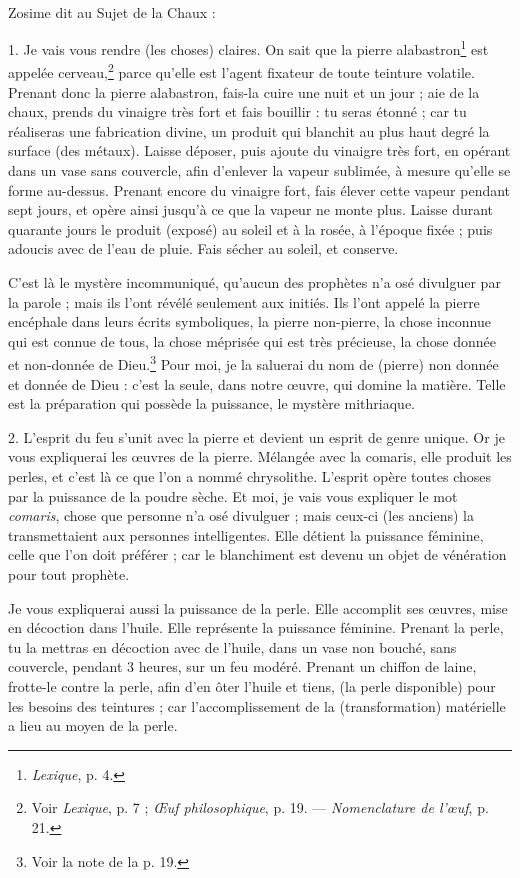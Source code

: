 \documentclass[a4paper, 11pt, oneside, polutonikogreek, french]{article}
\begin{document}
\paragraph{}
Zosime dit au Sujet de la Chaux :

1. Je vais vous rendre (les choses) claires. On sait que la pierre alabastron\footnote{\emph{Lexique}, p. 4.} est appelée cerveau,\footnote{Voir \emph{Lexique}, p. 7 ; \emph{Œuf philosophique}, p. 19. --- \emph{Nomenclature de l'œuf}, p. 21.} parce qu'elle est l'agent fixateur de toute teinture volatile. Prenant donc la pierre alabastron, fais-la cuire une nuit et un jour ; aie de la chaux, prends du vinaigre très fort et fais bouillir : tu seras étonné ; car tu réaliseras une fabrication divine, un produit qui blanchit au plus haut degré la surface (des métaux). Laisse déposer, puis ajoute du vinaigre très fort, en opérant dans un vase sans couvercle, afin d'enlever la vapeur sublimée, à mesure qu'elle se forme au-dessus. Prenant encore du vinaigre fort, fais élever cette vapeur pendant sept jours, et opère ainsi jusqu'à ce que la vapeur ne monte plus. Laisse durant quarante jours le produit (exposé) au soleil et à la rosée, à l'époque fixée ; puis adoucis avec de l'eau de pluie. Fais sécher au soleil, et conserve.

C'est là le mystère incommuniqué, qu'aucun des prophètes n'a osé divulguer par la parole ; mais ils l'ont révélé seulement aux initiés. Ils l'ont appelé la pierre encéphale dans leurs écrits symboliques, la pierre non-pierre, la chose inconnue qui est connue de tous, la chose méprisée qui est très précieuse, la chose donnée et non-donnée de Dieu.\footnote{Voir la note de la p. 19.} Pour moi, je la saluerai du nom de (pierre) non donnée et donnée de Dieu : c'est la seule, dans notre œuvre, qui domine la matière. Telle est la préparation qui possède la puissance, le mystère mithriaque.

2. L'esprit du feu s'unit avec la pierre et devient un esprit de genre unique. Or je vous expliquerai les œuvres de la pierre. Mélangée avec la comaris, elle produit les perles, et c'est là ce que l'on a nommé chrysolithe. L'esprit opère toutes choses par la puissance de la poudre sèche. Et moi, je vais vous expliquer le mot \emph{comaris}, chose que personne n'a osé divulguer ; mais ceux-ci (les anciens) la transmettaient aux personnes intelligentes. Elle détient la puissance féminine, celle que l'on doit préférer ; car le blanchiment est devenu un objet de vénération pour tout prophète.

Je vous expliquerai aussi la puissance de la perle. Elle accomplit ses œuvres, mise en décoction dans l'huile. Elle représente la puissance féminine. Prenant la perle, tu la mettras en décoction avec de l'huile, dans un vase non bouché, sans couvercle, pendant 3 heures, sur un feu modéré. Prenant un chiffon de laine, frotte-le contre la perle, afin d'en ôter l'huile et tiens, (la perle disponible) pour les besoins des teintures ; car l'accomplissement de la (transformation) matérielle a lieu au moyen de la perle.
\end{document}
